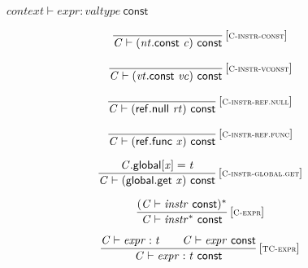 $\boxed{{\mathit{context}} \vdash {\mathit{expr}} : {\mathit{valtype}}~\mathsf{const}}$

$$
\begin{array}{@{}c@{}}\displaystyle
\frac{
}{
{\mathit{C}} \vdash ({\mathit{nt}}.\mathsf{const}~{\mathit{c}})~\mathsf{const}
} \, {[\textsc{\scriptsize C{-}instr{-}const}]}
\qquad
\end{array}
$$

$$
\begin{array}{@{}c@{}}\displaystyle
\frac{
}{
{\mathit{C}} \vdash ({\mathit{vt}}.\mathsf{const}~{\mathit{vc}})~\mathsf{const}
} \, {[\textsc{\scriptsize C{-}instr{-}vconst}]}
\qquad
\end{array}
$$

$$
\begin{array}{@{}c@{}}\displaystyle
\frac{
}{
{\mathit{C}} \vdash (\mathsf{ref.null}~{\mathit{rt}})~\mathsf{const}
} \, {[\textsc{\scriptsize C{-}instr{-}ref.null}]}
\qquad
\end{array}
$$

$$
\begin{array}{@{}c@{}}\displaystyle
\frac{
}{
{\mathit{C}} \vdash (\mathsf{ref.func}~{\mathit{x}})~\mathsf{const}
} \, {[\textsc{\scriptsize C{-}instr{-}ref.func}]}
\qquad
\end{array}
$$

$$
\begin{array}{@{}c@{}}\displaystyle
\frac{
{\mathit{C}}.\mathsf{global}{}[{\mathit{x}}] = {\mathit{t}}
}{
{\mathit{C}} \vdash (\mathsf{global.get}~{\mathit{x}})~\mathsf{const}
} \, {[\textsc{\scriptsize C{-}instr{-}global.get}]}
\qquad
\end{array}
$$

\vspace{1ex}

$$
\begin{array}{@{}c@{}}\displaystyle
\frac{
({\mathit{C}} \vdash {\mathit{instr}}~\mathsf{const})^\ast
}{
{\mathit{C}} \vdash {{\mathit{instr}}^\ast}~\mathsf{const}
} \, {[\textsc{\scriptsize C{-}expr}]}
\qquad
\end{array}
$$

\vspace{1ex}

$$
\begin{array}{@{}c@{}}\displaystyle
\frac{
{\mathit{C}} \vdash {\mathit{expr}} : {\mathit{t}}
 \qquad
{\mathit{C}} \vdash {\mathit{expr}}~\mathsf{const}
}{
{\mathit{C}} \vdash {\mathit{expr}} : {\mathit{t}}~\mathsf{const}
} \, {[\textsc{\scriptsize TC{-}expr}]}
\qquad
\end{array}
$$

